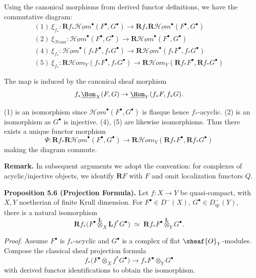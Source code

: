 \setcounter{page}{104}
Using the canonical morphisms from derived functor definitions, we have the commutative diagram:
\[
\begin{array}{l}
(1)\ \xi_{f_*}\colon \mathbf{R}f_*\underline{\mathcal{H}\textit{om}}^\bullet(F^\bullet,G^\bullet)
\to \mathbf{R}f_*\mathbf{R}\underline{\mathcal{H}\textit{om}}^\bullet(F^\bullet,G^\bullet) \\
(2)\ \xi_{\mathcal{H}\textit{om}}\colon \underline{\mathcal{H}\textit{om}}^\bullet(F^\bullet,G^\bullet)
\to \mathbf{R}\underline{\mathcal{H}\textit{om}}^\bullet(F^\bullet,G^\bullet) \\
(4)\ \xi_{f_*}\colon \underline{\mathcal{H}\textit{om}}^\bullet(f_*F^\bullet,f_*G^\bullet)
\to \mathbf{R}\underline{\mathcal{H}\textit{om}}^\bullet(f_*F^\bullet,f_*G^\bullet) \\
(5)\ \xi_{f_*}\colon \mathbf{R}\mathcal{H}\textit{om}_Y(f_*F^\bullet,f_*G^\bullet)
\to \mathbf{R}\mathcal{H}\textit{om}_Y(\mathbf{R}f_*F^\bullet,\mathbf{R}f_*G^\bullet)
\end{array}
\]

The map is induced by the canonical sheaf morphism
\[
f_*\underline{\Hom}_X(F,G)
\to
\underline{\Hom}_Y(f_*F,f_*G).
\]

\setcounter{page}{105}
(1) is an isomorphism since $\underline{\mathcal{H}\textit{om}}^\bullet(F^\bullet,G^\bullet)$ is flasque hence $f_*$-acyclic.
(2) is an isomorphism as $G^\bullet$ is injective.
(4), (5) are likewise isomorphisms.
Thus there exists a unique functor morphism
\[
\Psi\colon
\mathbf{R}f_*\mathbf{R}\underline{\mathcal{H}\textit{om}}^\bullet(F^\bullet,G^\bullet)
\to
\mathbf{R}\mathcal{H}\textit{om}_Y(\mathbf{R}f_*F^\bullet,\mathbf{R}f_*G^\bullet)
\]
making the diagram commute.

\textbf{Remark.}
In subsequent arguments we adopt the convention:
for complexes of acyclic/injective objects, we identify $\mathbf{R}F$ with $F$ and omit localization functors $Q$.

\setcounter{page}{106}
\textbf{Proposition 5.6 (Projection Formula).}
Let $f\colon X\to Y$ be quasi-compact, with $X,Y$ noetherian of finite Krull dimension.
For $F^\bullet\in D^-(X)$, $G^\bullet\in D_{\mathrm{qc}}^-(Y)$, there is a natural isomorphism
\[
\mathbf{R}f_*\big(F^\bullet \stackrel{\mathbf{L}}{\otimes}_X \mathbf{L}f^*G^\bullet\big)
\;\simeq\;
\mathbf{R}f_*F^\bullet \stackrel{\mathbf{L}}{\otimes}_Y G^\bullet.
\]

\textit{Proof.}
Assume $F^\bullet$ is $f_*$-acyclic and $G^\bullet$ is a complex of flat $\sheaf{O}_Y$-modules.
Compose the classical sheaf projection formula
\[
f_*\big(F^\bullet\otimes_X f^*G^\bullet\big)
\to
f_*F^\bullet\otimes_Y G^\bullet
\]
with derived functor identifications to obtain the isomorphism.